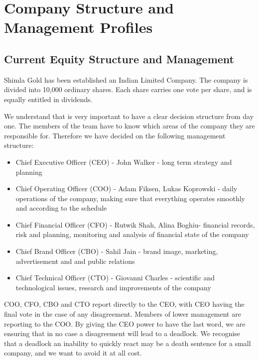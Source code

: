 \documentclass[11pt]{article}
\begin{document}
\section{Company Structure and Management Profiles}

  \subsection{Current Equity Structure and Management}
Shimla Gold has been established an Indian Limited Company. The company is 
divided into 10,000 ordinary shares. Each share carries one vote per share, 
and is equally entitled in dividends.

We understand that is very important to have a clear decision structure from 
day one. The members of the team have to know which areas of the company they 
are responsible for. Therefore we have decided on the following management
structure:

  \begin{itemize}
  \item Chief Executive Officer (CEO) - John Walker - 
long term strategy and planning
  \item Chief Operating Officer (COO) - Adam Fiksen, Lukas Koprowski - 
daily operations of the company, making sure that everything operates smoothly 
and according to the schedule
  \item Chief Financial Officer (CFO) - Rutwik Shah, Alina Boghiu- 
financial records, risk and planning, monitoring and analysis of financial 
state of the company
  \item Chief Brand Officer (CBO) - Sahil Jain -
 brand image, marketing, advertisement and and public relations
  \item Chief Technical Officer (CTO) - Giovanni Charles - 
scientific and technological issues, research and improvements of the company
  \end{itemize}

COO, CFO, CBO and CTO report directly to the CEO, with CEO having the final vote
in the case of any disagreement. Members of lower management are reporting to 
the COO. By giving the CEO power to have the last word, we are ensuring that in 
no case a disagreement will lead to a deadlock. We recognise that a deadlock an 
inability to quickly react may be a death sentence for a small company, and we 
want to avoid it at all cost.
\end{document}

